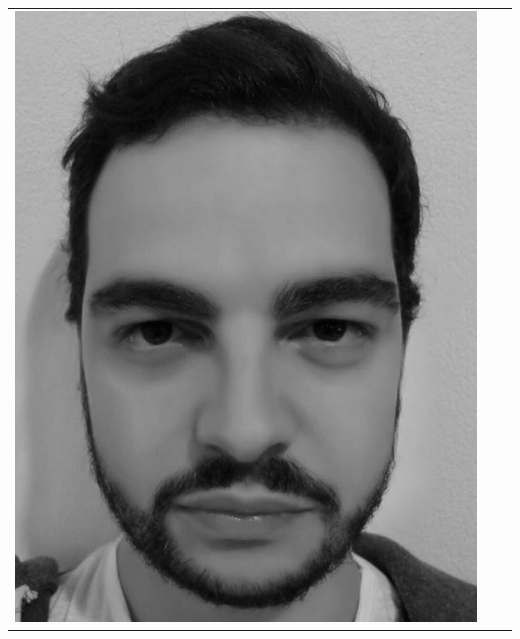 \documentclass{article}
\begin{document}
\begin{tabular}{ | c | c | c |  }
   \includegraphics[scale = 0.18]{img/martella.jpg}
\end{tabular}
\end{document}
